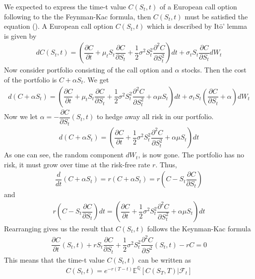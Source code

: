 We expected to express the time-t value $C(S_t, t)$ of a European call option following to the the Feynman-Kac formula, then $C(S_t, t)$ must be satisfied the equation (). A European call option $C(S_t, t)$ which is described by It\=o' lemma is given by
\begin{align*}
dC(S_t, t)=\left(\dfrac{\partial C}{\partial t}+\mu_tS_t\dfrac{\partial C}{\partial S_t}+\dfrac{1}{2}\sigma^2 S_t^2\dfrac{\partial^2 C}{\partial S_t^2}\right)dt+\sigma_tS_t\dfrac{\partial C}{\partial S_t}dW_t
\end{align*}
Now consider  portfolio consisting of the call option and $\alpha$ stocks. Then the
cost of the portfolio is $C+\alpha S_t$. We get
\begin{align*}
d(C+\alpha S_t)=\left(\dfrac{\partial C}{\partial t}+\mu_tS_t\dfrac{\partial C}{\partial S_t}+\dfrac{1}{2}\sigma^2 S_t^2\dfrac{\partial^2 C}{\partial S_t^2}+\alpha\mu S_t\right)dt+\sigma_tS_t\left(\dfrac{\partial C}{\partial S_t}+\alpha\right)dW_t
\end{align*}
Now we let $\alpha=-\dfrac{\partial C}{\partial S_t}(S_t,t)$ to hedge away all risk in our portfolio.
\begin{align*}
d(C+\alpha S_t)=\left(\dfrac{\partial C}{\partial t}+\dfrac{1}{2}\sigma^2 S_t^2\dfrac{\partial^2 C}{\partial S_t^2}+\alpha\mu S_t\right)dt
\end{align*}
As one can see, the random component $dW_t$, is now gone. The portfolio has no risk, it must grow
over time at the risk-free rate $r$. Thus,
\begin{align*}
	\dfrac{d}{dt}(C+\alpha S_t)=r(C+\alpha S_t)=r(C-S_t\dfrac{\partial C}{\partial S_t})
\end{align*}
and
\begin{align*}
	r(C-S_t\dfrac{\partial C}{\partial S_t})dt=\left(\dfrac{\partial C}{\partial t}+\dfrac{1}{2}\sigma^2 S_t^2\dfrac{\partial^2 C}{\partial S_t^2}+\alpha\mu S_t\right)dt
\end{align*}
Rearranging gives us the result that $C(S_t, t)$ follows the Keynman-Kac formula
\begin{align*}
	\dfrac{\partial C}{\partial t}(S_t, t)+rS_t\dfrac{\partial C}{\partial S_t}+\dfrac{1}{2}\sigma^2S_t^2\dfrac{\partial^2C}{\partial S^2}(S_t, t)-rC=0
\end{align*}
This means that the time-t value $C(S_t, t)$ can be written as
\begin{align}
		C(S_t, t)=e^{-r(T-t)}\mathbb{E}^\mathbb{Q}[C (S_T, T)|\mathcal{F}_t] \label{eq5.5.1}
\end{align}
